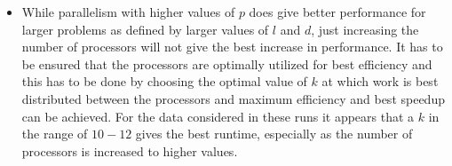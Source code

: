 \documentclass[twoside,11pt]{article}\usepackage{amsmath,amsfonts,amsthm,fullpage}
\begin{document}
\begin{itemize}
\item
While parallelism with higher values of $p$ does give better performance for larger problems as defined by larger values of $l$ and $d$, just increasing the number of processors will not give the best increase in performance. It has to be ensured that the processors are optimally utilized for best efficiency and this has to be done by choosing the optimal value of $k$ at which work is best distributed between the processors and maximum efficiency and best speedup can be achieved. For the data considered in these runs it appears that a $k$ in the range of $10-12$ gives the best runtime, especially as the number of processors is increased to higher values.
\end{itemize}




\end{document}
